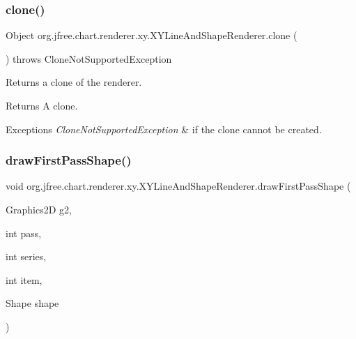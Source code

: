 \subsubsection{\texorpdfstring{clone()}{clone()}}
{\footnotesize\ttfamily Object org.\+jfree.\+chart.\+renderer.\+xy.\+X\+Y\+Line\+And\+Shape\+Renderer.\+clone (\begin{DoxyParamCaption}{ }\end{DoxyParamCaption}) throws Clone\+Not\+Supported\+Exception}

Returns a clone of the renderer.

\begin{DoxyReturn}{Returns}
A clone.
\end{DoxyReturn}

\begin{DoxyExceptions}{Exceptions}
{\em Clone\+Not\+Supported\+Exception} & if the clone cannot be created. \\
\hline
\end{DoxyExceptions}
\mbox{\label{classorg_1_1jfree_1_1chart_1_1renderer_1_1xy_1_1_x_y_line_and_shape_renderer_ac3db516e37316d1935162a6e32781037}} 
\subsubsection{\texorpdfstring{draw\+First\+Pass\+Shape()}{drawFirstPassShape()}}
{\footnotesize\ttfamily void org.\+jfree.\+chart.\+renderer.\+xy.\+X\+Y\+Line\+And\+Shape\+Renderer.\+draw\+First\+Pass\+Shape (\begin{DoxyParamCaption}\item[{Graphics2D}]{g2,  }\item[{int}]{pass,  }\item[{int}]{series,  }\item[{int}]{item,  }\item[{Shape}]{shape }\end{DoxyParamCaption})\hspace{0.3cm}{\ttfamily [protected]}}


